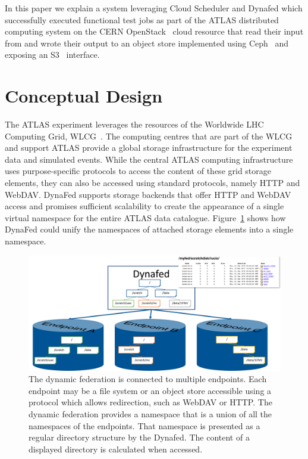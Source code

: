 \documentclass[a4paper]{jpconf}
\begin{document}
In this paper we explain a system leveraging Cloud Scheduler and Dynafed which successfully executed functional test jobs as part of the ATLAS distributed computing system on the CERN OpenStack~\cite{openstack} cloud resource that read their input from and wrote their output to an object store implemented using Ceph~\cite{ceph} and exposing an S3~\cite{s3} interface.

\section{Conceptual Design}
The ATLAS experiment leverages the resources of the Worldwide LHC Computing Grid, WLCG~\cite{wlcg}. The computing centres that are part of the WLCG and support ATLAS provide a global storage infrastructure for the experiment data and simulated events. While the central ATLAS computing infrastructure uses purpose-specific protocols to access the content of these grid storage elements, they can also be accessed using standard protocols, namely HTTP and WebDAV. DynaFed supports storage backends that offer HTTP and WebDAV access and promises sufficient scalability to create the appearance of a single virtual namespace for the entire ATLAS data catalogue.  Figure~\ref{fig:conceptual-design} shows how DynaFed could unify the namespaces of attached storage elements into a single namespace.

\begin{figure}
  \centering
  \includegraphics[width=\textwidth]{conceptual-design.png}
  \caption{The dynamic federation is connected to multiple endpoints. Each endpoint may be a file system or an object store accessible using a protocol which allows redirection, such as WebDAV or HTTP. The dynamic federation provides a namespace that is a union of all the namespaces of the endpoints. That namespace is presented as a regular directory structure by the Dynafed. The content of a displayed directory is calculated when accessed.}
  \label{fig:conceptual-design}
\end{figure}
\end{document}
